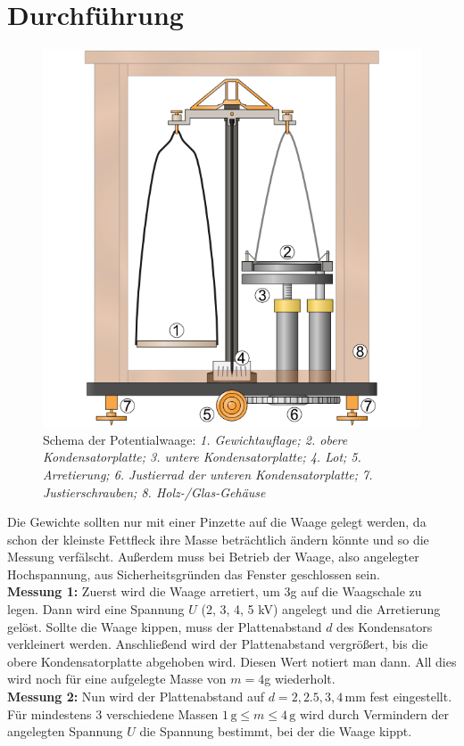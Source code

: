 \documentclass[12pt,a4paper,titlepage,headinclude,bibtotoc]{scrartcl}
\begin{document}
\section{Durchführung}
\label{sec:durchfuehrung}
\begin{figure}[!htb]
	\centering	
	\includegraphics[scale=0.7]{PotWaageSchema.png}
	\caption{Schema der Potentialwaage: \small{\emph{1. Gewichtauflage; 2. obere Kondensatorplatte; 3. untere Kondensatorplatte; 4. Lot; 5. Arretierung; 6. Justierrad der unteren Kondensatorplatte; 7. Justierschrauben; 8. Holz-/Glas-Gehäuse}}\protect\footnotemark}
	\label{fig:PotWaageSchema}
\end{figure}

Die Gewichte sollten nur mit einer Pinzette auf die Waage gelegt werden, da schon der kleinste Fettfleck ihre Masse beträchtlich ändern könnte und so die Messung verfälscht.
Außerdem muss bei Betrieb der Waage, also angelegter Hochspannung, aus Sicherheitsgründen das Fenster geschlossen sein.\\

\textbf{Messung 1:}
Zuerst wird die Waage arretiert, um 3g auf die Waagschale zu legen.
Dann wird eine Spannung $U$ (2, 3, 4, 5 kV) angelegt und die Arretierung gelöst.
Sollte die Waage kippen, muss der Plattenabstand $d$ des Kondensators verkleinert werden.
Anschließend wird der Plattenabstand vergrößert, bis die obere Kondensatorplatte abgehoben wird.
Diesen Wert notiert man dann.
All dies wird noch für eine aufgelegte Masse von $m=4$g wiederholt.\\  
\textbf{Messung 2:}
Nun wird der Plattenabstand auf $d=2, 2.5, 3, 4\,$mm fest eingestellt.
Für mindestens 3 verschiedene Massen $1\,\text{g}\leq m \leq 4\,\text{g}$ wird durch Vermindern der angelegten Spannung $U$ die Spannung bestimmt, bei der die Waage kippt.
\end{document}

